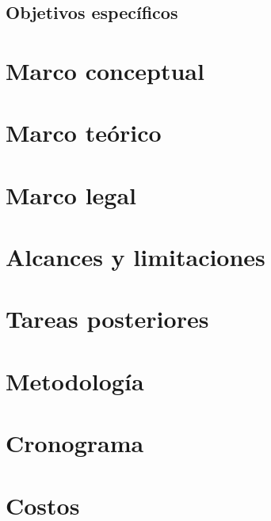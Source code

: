 \documentclass[letter,12pt]{book}
\begin{document}
  \section{Objetivos específicos}
   

  \chapter{Marco conceptual}
  
 
  \chapter{Marco teórico}
  
  
  \chapter{Marco legal}
  
  
  \chapter{Alcances y limitaciones}
  
  
  \chapter{Tareas posteriores}
  
  
  \chapter{Metodología}
  
  
  \chapter{Cronograma}
  
  
  \chapter{Costos}
  \label{cap:costos}
  
  
  
  
  
  
\end{document}
